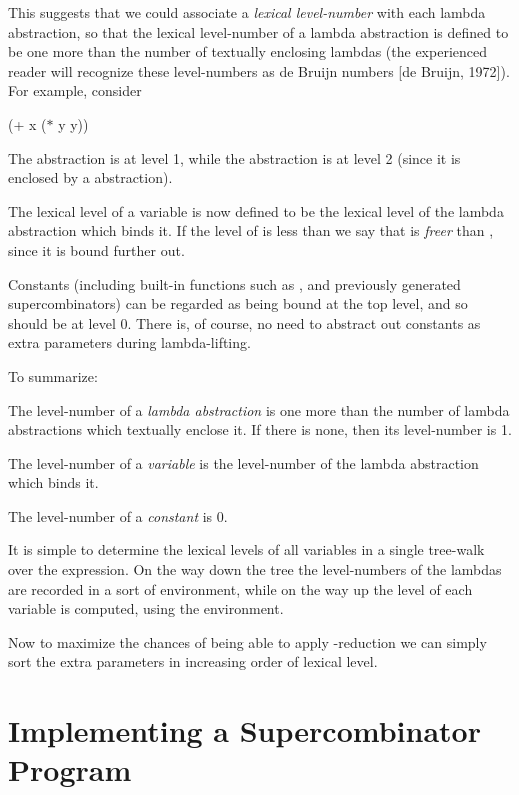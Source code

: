 This suggests that we could associate a \textit{lexical level-number} with each
lambda abstraction, so that the lexical level-number of a lambda abstraction is
defined to be one more than the number of textually enclosing lambdas (the
experienced reader will recognize these level-numbers as de Bruijn numbers
[de Bruijn, 1972]). For example, consider
\begin{mlcoded}
    (+ x ($\ast$ y y))
\end{mlcoded}
The  abstraction is at level 1, while the  abstraction is at level 2 (since it is
enclosed by a  abstraction).

The lexical level of a variable is now defined to be the lexical level of the
lambda abstraction which binds it. If the level of  is less than  we say that  is
\textit{freer} than , since it is bound further out.

Constants (including built-in functions such as \ml{+}, and previously generated
supercombinators) can be regarded as being bound at the top level, and so
should be at level 0. There is, of course, no need to abstract out constants as
extra parameters during lambda-lifting.

To summarize:

\begin{numbered}
    \item The level-number of a \textit{lambda abstraction} is one more than the number
    of lambda abstractions which textually enclose it. If there is none, then
    its level-number is 1.
    \item The level-number of a \textit{variable} is the level-number of the lambda
    abstraction which binds it.
    \item The level-number of a \textit{constant} is 0.
\end{numbered}

It is simple to determine the lexical levels of all variables in a single
tree-walk over the expression. On the way down the tree the level-numbers of
the lambdas are recorded in a sort of environment, while on the way up the
level of each variable is computed, using the environment.

Now to maximize the chances of being able to apply \te-reduction we can
simply sort the extra parameters in increasing order of lexical level.

\section{Implementing a Supercombinator Program}

